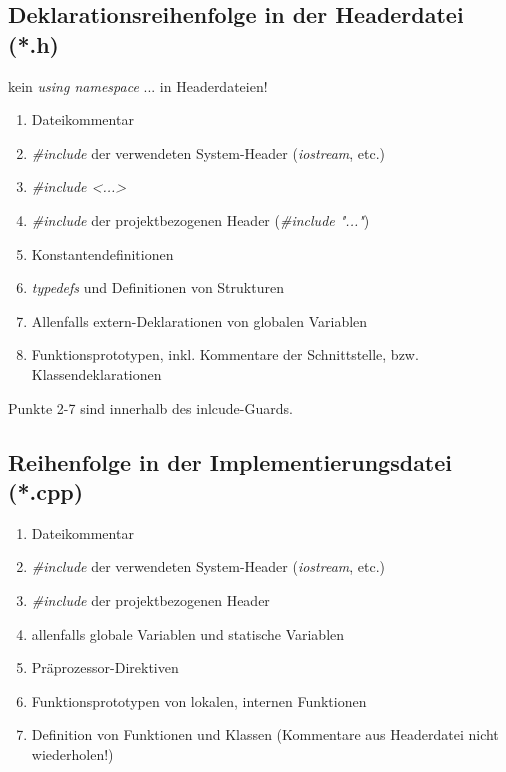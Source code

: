 \begin{multicols}{2}
\subsection{Deklarationsreihenfolge in der Headerdatei (*.h)}
\begin{achtung}
	kein \emph{using namespace} ... in Headerdateien!
\end{achtung}
\begin{enumerate}
	\item Dateikommentar
	\item \emph{\#include} der verwendeten System-Header (\emph{iostream}, etc.)
	\item[\-] \emph{\#include <...>}
	\item \emph{\#include} der projektbezogenen Header (\emph{\#include "..."})
	\item Konstantendefinitionen
	\item \emph{typedefs} und Definitionen von Strukturen
	\item Allenfalls extern-Deklarationen von globalen Variablen
	\item Funktionsprototypen, inkl. Kommentare der Schnittstelle, bzw. Klassendeklarationen
\end{enumerate}
\begin{hinweis}
	Punkte 2-7 sind innerhalb des inlcude-Guards.
\end{hinweis}
\columnbreak
\subsection{Reihenfolge in der Implementierungsdatei (*.cpp)}
\begin{enumerate}
	\item Dateikommentar
	\item \emph{\#include} der verwendeten System-Header (\emph{iostream}, etc.)
	\item \emph{\#include} der projektbezogenen Header
	\item allenfalls globale Variablen und statische Variablen
	\item Präprozessor-Direktiven
	\item Funktionsprototypen von lokalen, internen Funktionen
	\item Definition von Funktionen und Klassen (Kommentare aus Headerdatei nicht wiederholen!)
\end{enumerate}
\end{multicols}


